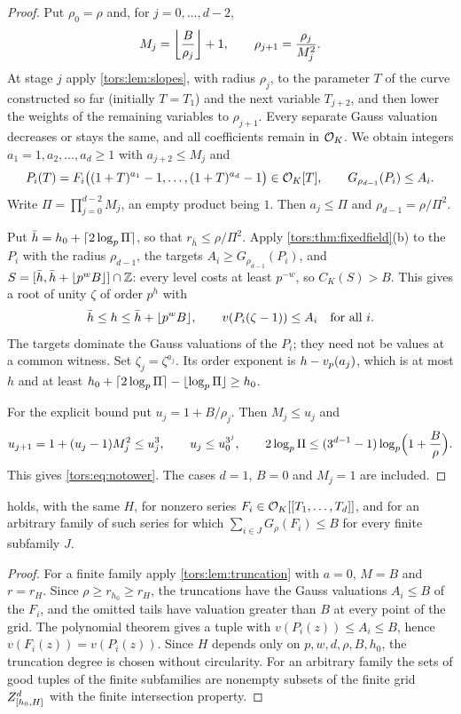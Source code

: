 \begin{proof}
Put $\rho_0=\rho$ and, for $j=0,\dots,d-2$,
\[
  M_j=\floor*{\frac{B}{\rho_j}}+1,\qquad \rho_{j+1}=\frac{\rho_j}{M_j^2}.
\]
At stage $j$ apply \cref{tors:lem:slopes}, with radius $\rho_j$, to the parameter $T$ of
the curve constructed so far (initially $T=T_1$) and the next variable $T_{j+2}$, and
then lower the weights of the remaining variables to $\rho_{j+1}$. Every separate Gauss
valuation decreases or stays the same, and all coefficients remain in $\OO_K$. We obtain
integers $a_1=1,a_2,\dots,a_d\ge1$ with $a_{j+2}\le M_j$ and
\[
  P_i(T)=F_i\bigl((1+T)^{a_1}-1,\dots,(1+T)^{a_d}-1\bigr)\in\OO_K[T],\qquad
  G_{\rho_{d-1}}(P_i)\le A_i .
\]
Write $\Pi=\prod_{j=0}^{d-2}M_j$, an empty product being $1$. Then $a_j\le\Pi$ and
$\rho_{d-1}=\rho/\Pi^2$.

Put $\bar h=h_0+\ceil{2\log_p\Pi}$, so that $r_{\bar h}\le\rho/\Pi^2$. Apply
\cref{tors:thm:fixedfield}(b) to the $P_i$ with the radius $\rho_{d-1}$, the targets
$A_i\ge G_{\rho_{d-1}}(P_i)$, and $S=[\bar h,\bar h+\floor{p^wB}]\cap\Z$: every level
costs at least $p^{-w}$, so $C_K(S)>B$. This gives a root of unity $\zeta$ of order
$p^h$ with
\[
  \bar h\le h\le\bar h+\floor{p^wB},\qquad v(P_i(\zeta-1))\le A_i\quad\text{for all }i .
\]
The targets dominate the Gauss valuations of the $P_i$; they need not be values at a
common witness. Set $\zeta_j=\zeta^{a_j}$. Its order exponent is $h-\vp(a_j)$, which is
at most $h$ and at least
$h_0+\ceil{2\log_p\Pi}-\floor{\log_p\Pi}\ge h_0$.

For the explicit bound put $u_j=1+B/\rho_j$. Then $M_j\le u_j$ and
\[
  u_{j+1}=1+(u_j-1)M_j^2\le u_j^3,\qquad u_j\le u_0^{3^j},\qquad
  2\log_p\Pi\le(3^{d-1}-1)\log_p\Bigl(1+\frac B\rho\Bigr).
\]
This gives \eqref{tors:eq:notower}. The cases $d=1$, $B=0$ and $M_j=1$ are included.
\end{proof}

\begin{corollary}
\label{tors:cor:notowerseries}
 holds, with the same $H$, for nonzero series
$F_i\in\OO_K[[T_1,\dots,T_d]]$, and for an arbitrary family of such series for which
$\sum_{i\in J}G_\rho(F_i)\le B$ for every finite subfamily $J$.
\end{corollary}

\begin{proof}
For a finite family apply \cref{tors:lem:truncation} with $a=0$, $M=B$ and $r=r_H$. Since
$\rho\ge r_{h_0}\ge r_H$, the truncations have the Gauss valuations $A_i\le B$ of the
$F_i$, and the omitted tails have valuation greater than $B$ at every point of the grid.
The polynomial theorem gives a tuple with $v(P_i(z))\le A_i\le B$, hence
$v(F_i(z))=v(P_i(z))$. Since $H$ depends only on $p,w,d,\rho,B,h_0$, the truncation
degree is chosen without circularity. For an arbitrary family the sets of good tuples of
the finite subfamilies are nonempty subsets of the finite grid $\torsZ{h_0}{H}^d$ with
the finite intersection property.
\end{proof}

